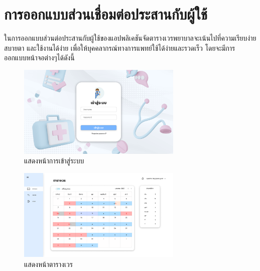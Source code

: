 \baselineskip=8mm
\renewcommand{\thesubsection}{\arabic{subsection}.}
\renewcommand{\theequation}{\thesection.\arabic{equation}}
\renewcommand{\thesection}{}
\renewcommand{\thesubsubsection}{\thesubsection\arabic{subsubsection}.}




\section{การออกแบบส่วนเชื่อมต่อประสานกับผู้ใช้}

ในการออกแบบส่วนต่อประสานกับผู้ใช้ของแอปพลิเคชันจัดตารางเวรพยาบาลจะเน้นไปที่ความเรียบง่าย สบายตา และใช้งานได้ง่าย เพื่อให้บุคคลากรณ์ทางการแพทย์ใช้ได้ง่ายและรวดเร็ว โดยจะมีการออกแบบหน้าจอต่างๆได้ดังนี้

\vspace{1.5cm}


\begin{figure}[h]
    \centering
    \includegraphics[width=0.7\textwidth]{Login ui.png}
    \caption{แสดงหน้าการเข้าสู่ระบบ}
    \end{figure}

\begin{figure}
    \centering
    \includegraphics[width=0.7\textwidth]{Home ui.png}
    \caption{แสดงหน้าตารางเวร}
\end{figure}

